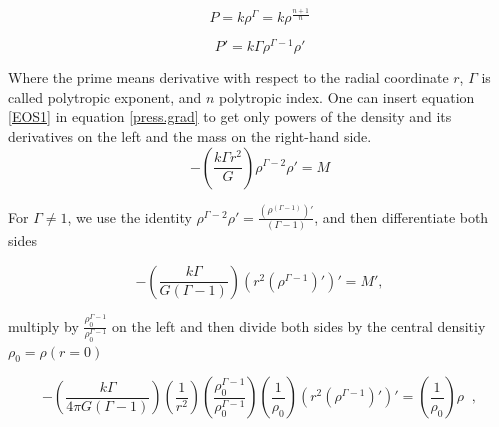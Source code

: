 \begin{equation}\label{EOS0}
P = k \rho^{\Gamma} = k \rho^{\frac{n+1}{n}}
\end{equation}

\begin{equation}\label{EOS1}
P' = k \Gamma \rho^{\Gamma-1} \rho'
\end{equation}


Where the prime means derivative with respect to the radial coordinate $r$, $\Gamma$ is called polytropic exponent, and $n$ polytropic index. One can insert equation \ref{EOS1} in equation \ref{press.grad} to get only powers of the density and its derivatives on the left and the mass on the right-hand side. 
$$
-\left( \frac{k \Gamma r^2}{G} \right) \rho^{\Gamma-2} \rho' = M
$$

%
%

For $\Gamma \neq 1$, we use the identity $\rho^{\Gamma-2} \rho' = \frac{(\rho^{(\Gamma -1)})'}{(\Gamma -1)}$, and then differentiate both sides

\begin{equation}
-\left( \frac{k \Gamma}{G(\Gamma-1)} \right) (r^2 (\rho^{\Gamma-1})')' = M',
\end{equation}

multiply by $\frac{\rho_0^{\Gamma-1}}{\rho_0^{\Gamma-1}}$ on the left and then divide both sides by  the central densitiy $\rho_0 = \rho(r=0)$

\begin{equation}
-\left( \frac{k \Gamma}{4\pi G(\Gamma-1)} \right)\left(\frac{1}{r^2}\right) \left( \frac{\rho_0^{\Gamma-1}}{\rho_0^{\Gamma-1}} \right) \left( \frac{1}{\rho_0} \right)(r^2 (\rho^{\Gamma-1})' )' = \left( \frac{1}{\rho_0} \right) \rho \;\;,
\end{equation}


